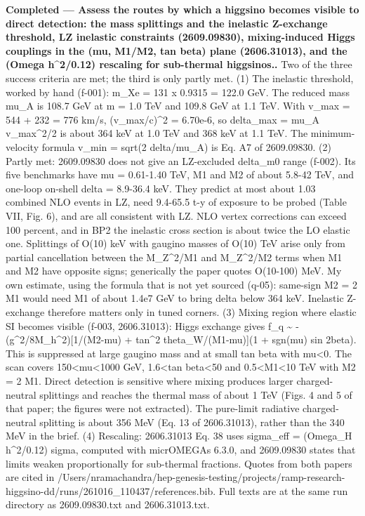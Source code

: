 \documentclass[11pt,a4paper]{article}
\begin{document}
\textbf{Completed --- Assess the routes by which a higgsino becomes visible to direct detection: the mass splittings and the inelastic Z-exchange threshold, LZ inelastic constraints (2609.09830), mixing-induced Higgs couplings in the (mu, M1/M2, tan beta) plane (2606.31013), and the (Omega h\textasciicircum{}2/0.12) rescaling for sub-thermal higgsinos..} Two of the three success criteria are met; the third is only partly met. (1) The inelastic threshold, worked by hand (f-001): m\_Xe = 131 x 0.9315 = 122.0 GeV. The reduced mass mu\_A is 108.7 GeV at m = 1.0 TeV and 109.8 GeV at 1.1 TeV. With v\_max = 544 + 232 = 776 km/s, (v\_max/c)\textasciicircum{}2 = 6.70e-6, so delta\_max = mu\_A v\_max\textasciicircum{}2/2 is about 364 keV at 1.0 TeV and 368 keV at 1.1 TeV. The minimum-velocity formula v\_min = sqrt(2 delta/mu\_A) is Eq. A7 of 2609.09830. (2) Partly met: 2609.09830 does not give an LZ-excluded delta\_m0 range (f-002). Its five benchmarks have \textbar{}mu\textbar{} = 0.61-1.40 TeV, \textbar{}M1\textbar{} and M2 of about 5.8-42 TeV, and one-loop on-shell delta = 8.9-36.4 keV. They predict at most about 1.03 combined NLO events in LZ, need 9.4-65.5 t-y of exposure to be probed (Table VII, Fig. 6), and are all consistent with LZ. NLO vertex corrections can exceed 100 percent, and in BP2 the inelastic cross section is about twice the LO elastic one. Splittings of O(10) keV with gaugino masses of O(10) TeV arise only from partial cancellation between the M\_Z\textasciicircum{}2/M1 and M\_Z\textasciicircum{}2/M2 terms when M1 and M2 have opposite signs; generically the paper quotes O(10-100) MeV. My own estimate, using the formula that is not yet sourced (q-05): same-sign M2 = 2 M1 would need M1 of about 1.4e7 GeV to bring delta below 364 keV. Inelastic Z-exchange therefore matters only in tuned corners. (3) Mixing region where elastic SI becomes visible (f-003, 2606.31013): Higgs exchange gives f\_q \textasciitilde{} -(g\textasciicircum{}2/8M\_h\textasciicircum{}2)[1/(M2-\textbar{}mu\textbar{}) + tan\textasciicircum{}2 theta\_W/(M1-\textbar{}mu\textbar{})](1 + sgn(mu) sin 2beta). This is suppressed at large gaugino mass and at small tan beta with mu\textless{}0. The scan covers 150\textless{}\textbar{}mu\textbar{}\textless{}1000 GeV, 1.6\textless{}tan beta\textless{}50 and 0.5\textless{}M1\textless{}10 TeV with M2 = 2 M1. Direct detection is sensitive where mixing produces larger charged-neutral splittings and reaches the thermal mass of about 1 TeV (Figs. 4 and 5 of that paper; the figures were not extracted). The pure-limit radiative charged-neutral splitting is about 356 MeV (Eq. 13 of 2606.31013), rather than the 340 MeV in the brief. (4) Rescaling: 2606.31013 Eq. 38 uses sigma\_eff = (Omega\_H h\textasciicircum{}2/0.12) sigma, computed with micrOMEGAs 6.3.0, and 2609.09830 states that limits weaken proportionally for sub-thermal fractions. Quotes from both papers are cited in /Users/nramachandra/hep-genesis-testing/projects/ramp-research-higgsino-dd/runs/261016\_110437/references.bib. Full texts are at the same run directory as 2609.09830.txt and 2606.31013.txt.
\end{document}
